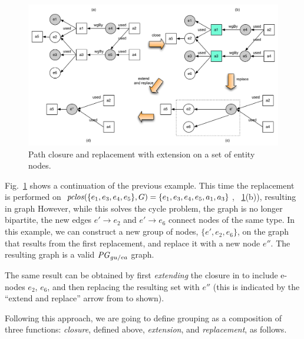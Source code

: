 \begin{figure}
\centering
\includegraphics[scale=.5]{figures/convex-ex-1.pdf} 
\caption{Path closure and replacement with extension on a set of entity nodes.} \label{fig:convex-ex-1}
\end{figure}

Fig.~\ref{fig:convex-ex-1} shows a continuation of the previous example. This time the replacement is performed on $\mathit{pclos}(\{e_1, e_3, e_4, e_5\},G) = \{e_1, e_3, e_4, e_5, a_1, a_3\}$, ~\ref{fig:convex-ex-1}(b)),  resulting in graph 
%
However, while this solves the cycle problem, the graph is no longer bipartite,  the new edges $e' \rightarrow e_2$ and $e' \rightarrow e_6$ connect nodes of the same type.
%
In this example, we can construct a new group of nodes, $\{ e', e_2, e_6\}$, on the graph that results from the first replacement, and replace it with a new node $e''$. The resulting graph  is a valid $\mathit{PG}_{gu/ea}$ graph.

%
The same result can be obtained by first \textit{extending} the closure in  to include e-nodes $e_2$, $e_6$, and then replacing the resulting set with $e''$ (this is indicated by the ``extend and replace'' arrow from  to  shown).
%

Following this approach, we are going to define grouping as a composition of three functions: \textit{closure}, defined above, \textit{extension}, and \textit{replacement}, as follows.

